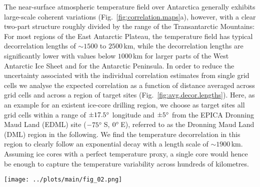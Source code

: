 \documentclass[cp, manuscript]{copernicus}
\begin{document}
The near-surface atmospheric temperature field over Antarctica generally
exhibits large-scale coherent variations (Fig.~\ref{fig:correlation.maps}a),
however, with a clear two-part structure roughly divided by the range of the
Transantarctic Mountains: For most regions of the East Antarctic Plateau, the
temperature field has typical decorrelation lengths of $\sim1500$ to $2500$\,km,
while the decorrelation lengths are significantly lower with values below
$1000$\,km for larger parts of the West Antarctic Ice Sheet and for the
Antarctic Peninsula. In order to reduce the uncertainty associated with the
individual correlation estimates from single grid cells we analyse the expected
correlation as a function of distance averaged across grid cells and across a
region of target sites (Fig.~\ref{fig:avg.decor.lengths}). Here, as an example
for an existent ice-core drilling region, we choose as target sites all grid
cells within a range of $\pm17.5^{\circ}$ longitude and $\pm5^{\circ}$ from the
EPICA Dronning Maud Land (EDML) site ($-75^{\circ}$\,S, $0^{\circ}$\,E), referred
to as the Dronning Maud Land (DML) region in the following. We find the
temperature decorrelation in this region to clearly follow an exponential decay
with a length scale of $\sim1900$\,km. Assuming ice cores with a perfect
temperature proxy, a single core would hence be enough to capture the
temperature variability across hundreds of kilometres.

\begin{figure*}[t]%
\centering
\texttt{[image: ../plots/main/fig\_02.png]}
\caption{%
  Temperature decorrelation lengths and temperature--isotope
  relationship. (\textbf{a}) The temperature decorrelation lengths ($\tau$, in
  km) for each Antarctic model grid cell estimated by fitting an exponential
  model to the correlation--distance relationship obtained from correlating the
  local near-surface $T_{2\mathrm{m}}$ time series with the temperature time
  series from all other grid cells (Eq.~\ref{eq:decor.model}). Note that only
  continental grid cells are used for the fit. (\textbf{b}) The local
  correlation between the interannual near-surface temperature
  ($T_{2\mathrm{m}}$) and precipitation-weighted oxygen isotope composition
  ($\delta^{18}\mathrm{O}^{\mathrm{(pw)}}$) time series for each Antarctic model
  grid cell.}
\label{fig:correlation.maps}%
\end{figure*}%
\end{document}

